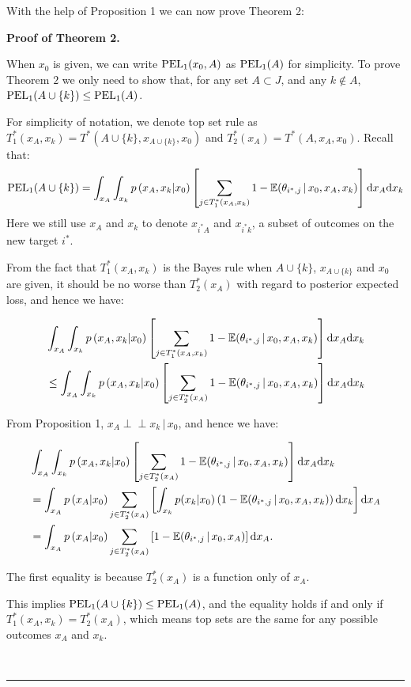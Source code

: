 \documentclass[12pt]{article}
\newenvironment{proof}[1][Proof]{\noindent\textbf{#1.} }{\ \rule{0.5em}{0.5em}}
\newcommand{\indep}{\perp \!\!\! \perp}
\begin{document}
With the help of Proposition 1 we can now prove Theorem 2:

\begin{proof}[Proof of Theorem 2]

When $x_0$ is given, we can write ${\mbox {\rm PEL}}_1(x_0,A)$ as ${\mbox {\rm PEL}}_1(A)$ for simplicity. To prove Theorem $2$ we only need to show that, for any set $A \subset J$, and any $k\notin A$, ${\mbox {\rm PEL}}_1(A\cup\{k\})\leq {\mbox {\rm PEL}}_1(A)$.

For simplicity of notation, we denote top set rule as 
$T_1^*(x_A,x_k) = T^*(A\cup\{k\}, x_{A\cup\{k\}}, x_0)$ and $T_2^*(x_A) = T^*(A, x_{A}, x_0)$. Recall that:
\begin{eqnarray*}
    {\mbox {\rm PEL}}_1(A\cup\{k\})= \int_{x_{A}}\int_{x_k} p\left( x_{A},x_k | x_0 \right) 
\left[ \sum_{j \in  T_1^*(x_A,x_k)}  1 - \mathbb{E} (\theta_{i^*,j} \, |\, x_0,x_A,x_k) \right]{\rm d}x_A {\rm d}x_k
\end{eqnarray*}
Here we still use $x_A$ and $x_k$ to denote $x_{i^*A}$ and $x_{i^*k}$, a subset of outcomes on the new target $i^*$.

From the fact that $T_1^*(x_A,x_k)$ is the Bayes rule when $A\cup\{k\}$, $x_{A\cup\{k\}}$ and $x_0$ are given, it should be no worse than $T_2^*(x_A)$ with regard to posterior expected loss, and hence we have:

\begin{align*}
&\int_{x_{A}}\int_{x_k} p\left( x_{A},x_k | x_0 \right)
\left[ \sum_{j \in  T_1^*(x_A,x_k)}  1 - \mathbb{E} (\theta_{i^*,j} \, |\, x_0,x_A,x_k) \right] {\rm d}x_A {\rm d}x_k\\
&\leq 
\int_{x_{A}}\int_{x_k} p\left( x_{A},x_k | x_0 \right)
\left[ \sum_{j \in  T_2^*(x_A)}  1 - \mathbb{E} (\theta_{i^*,j} \, |\, x_0,x_A,x_k) \right]{\rm d}x_A {\rm d}x_k
\end{align*}

From Proposition 1, $x_A \indep x_k \, | \, x_0$, and hence we have:

\begin{align*}
&\int_{x_{A}}\int_{x_k} p\left( x_{A},x_k | x_0 \right)
\left[ \sum_{j \in  T_2^*(x_A)}  1 - \mathbb{E} (\theta_{i^*,j} \, |\, x_0,x_A,x_k) \right]{\rm d}x_A {\rm d}x_k\\
    &= \int_{x_{A}}p\left(x_A|x_0\right)\sum_{j \in  T_2^*(x_A)}\left[\int_{x_k}p(x_k|x_0)\left(1-\mathbb{E} (\theta_{i^*,j} \, |\, x_0,x_A,x_k)\right){\rm d}x_k\right] {\rm d}x_A\\
&= \int_{x_{A}}p\left(x_A|x_0\right) \sum_{j \in  T_2^*(x_A)}\left[  1 - \mathbb{E} (\theta_{i^*,j} \, |\, x_0,x_A) \right]{\rm d}x_A.
\end{align*}


The first equality is because $T_2^*(x_A)$ is a function only of $x_A$. 

This implies ${\mbox {\rm PEL}}_1(A\cup\{k\})\leq {\mbox {\rm PEL}}_1(A)$, and the equality holds if and only if $T_1^*(x_A,x_k) = T_2^*(x_A)$, which means top sets are the same for any possible outcomes $x_A$ and $x_k$. 

\end{proof}
\end{document}
